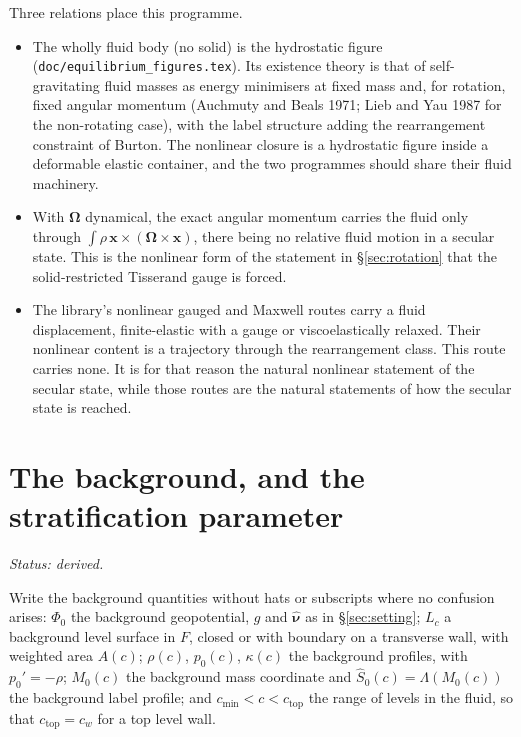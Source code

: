 \documentclass[11pt]{article}
\theoremstyle{definition}
\theoremstyle{remark}
\newcommand{\bx}{\mathbf{x}}
\newcommand{\bOmega}{\boldsymbol{\Omega}}
\newcommand{\code}[1]{\texttt{#1}}
\newcommand{\nuh}{\hat{\boldsymbol{\nu}}}
\newcommand{\status}[1]{\noindent\emph{Status: #1}\par\smallskip}
\begin{document}
Three relations place this programme.
\begin{itemize}
\item The wholly fluid body (no solid) is the hydrostatic figure
  (\code{doc/equilibrium\_figures.tex}). Its existence theory is that of
  self-gravitating fluid masses as energy minimisers at fixed mass and,
  for rotation, fixed angular momentum (Auchmuty and Beals 1971; Lieb
  and Yau 1987 for the non-rotating case), with the label structure
  adding the rearrangement constraint of Burton. The nonlinear closure
  is a hydrostatic figure inside a deformable elastic container, and
  the two programmes should share their fluid machinery.
\item With $\bOmega$ dynamical, the exact angular momentum carries the
  fluid only through $\int\rho\,\bx\times(\bOmega\times\bx)$, there
  being no relative fluid motion in a secular state. This is the
  nonlinear form of the statement in \S\ref{sec:rotation} that the
  solid-restricted Tisserand gauge is forced.
\item The library's nonlinear gauged and Maxwell routes carry a fluid
  displacement, finite-elastic with a gauge or viscoelastically
  relaxed. Their nonlinear content is a trajectory through the
  rearrangement class. This route carries none. It is for that reason
  the natural nonlinear statement of the secular state, while those
  routes are the natural statements of how the secular state is
  reached.
\end{itemize}

\section{The background, and the stratification parameter}
\label{sec:background}

\status{derived.}

Write the background quantities without hats or subscripts where no
confusion arises: $\Phi_0$ the background geopotential, $g$ and $\nuh$
as in \S\ref{sec:setting}; $L_c$ a background level surface in $F$,
closed or with boundary on a transverse wall, with weighted area
$A(c)$; $\rho(c)$, $p_0(c)$, $\kappa(c)$ the background profiles, with
$p_0' = -\rho$; $M_0(c)$ the background mass coordinate and $\hat
S_0(c) = \Lambda(M_0(c))$ the background label profile; and $c_{\min}
< c < c_{\mathrm{top}}$ the range of levels in the fluid, so that
$c_{\mathrm{top}} = c_w$ for a top level wall.
\end{document}
